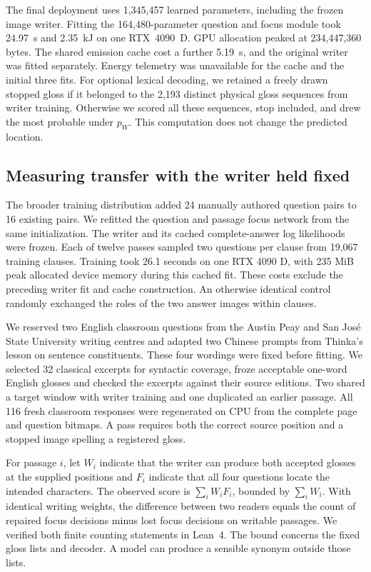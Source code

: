 \documentclass[12pt,a4paper]{article}
\providecommand{\DIFadd}[1]{{\protect\color{blue} \sf #1}} %
\begin{document}
\DIFadd{The final deployment uses 1,345,457 learned parameters, including the frozen image writer. Fitting the 164,480-parameter question and focus module took 24.97~s and 2.35~kJ on one RTX~4090~D. GPU allocation peaked at 234,447,360 bytes. The shared emission cache cost a further 5.19~s, and the original writer was fitted separately. Energy telemetry was unavailable for the cache and the initial three fits. For optional lexical decoding, we retained a freely drawn stopped gloss if it belonged to the 2,193 distinct physical gloss sequences from writer training. Otherwise we scored all these sequences, stop included, and drew the most probable under $p_W$. This computation does not change the predicted location.
}

\subsection*{\DIFadd{Measuring transfer with the writer held fixed}}
\DIFadd{The broader training distribution added 24 manually authored question pairs to 16 existing pairs. We refitted the question and passage focus network from the same initialization. The writer and its cached complete-answer log likelihoods were frozen. Each of twelve passes sampled two questions per clause from 19,067 training clauses. Training took 26.1 seconds on one RTX 4090 D, with 235 MiB peak allocated device memory during this cached fit. These costs exclude the preceding writer fit and cache construction. An otherwise identical control randomly exchanged the roles of the two answer images within clauses.
}

\DIFadd{We reserved two English classroom questions from the Austin Peay and San Jos\'e State University writing centres and adapted two Chinese prompts from Thinka's lesson on sentence constituents. These four wordings were fixed before fitting. We selected 32 classical excerpts for syntactic coverage, froze acceptable one-word English glosses and checked the excerpts against their source editions. Two shared a target window with writer training and one duplicated an earlier passage. All 116 fresh classroom responses were regenerated on CPU from the complete page and question bitmaps. A pass requires both the correct source position and a stopped image spelling a registered gloss.
}

\DIFadd{For passage $i$, let $W_i$ indicate that the writer can produce both accepted glosses at the supplied positions and $F_i$ indicate that all four questions locate the intended characters. The observed score is $\sum_i W_i F_i$, bounded by $\sum_i W_i$. With identical writing weights, the difference between two readers equals the count of repaired focus decisions minus lost focus decisions on writable passages. We verified both finite counting statements in Lean~4. The bound concerns the fixed gloss lists and decoder. A model can produce a sensible synonym outside those lists.
}
\end{document}
